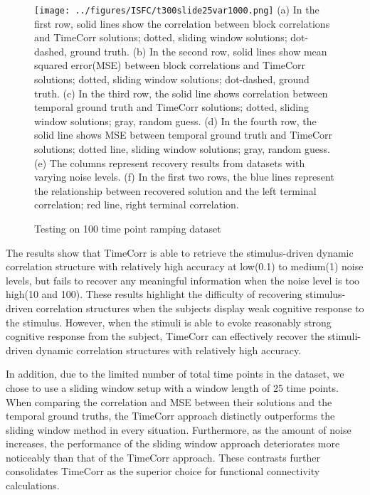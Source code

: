 \documentclass[11pt]{article}
\begin{document}
\begin{figure}[!htb]
\caption{Testing on 100 time point ramping dataset}
\texttt{[image: ../figures/ISFC/t300slide25var1000.png]}
\label{fig:t300slide25var1000}
(a) In the first row, solid lines show the correlation between block correlations and TimeCorr solutions; dotted, sliding window solutions; dot-dashed, ground truth. (b) In the second row, solid lines show mean squared error(MSE) between block correlations and TimeCorr solutions; dotted, sliding window solutions; dot-dashed, ground truth. (c) In the third row, the solid line shows correlation between temporal ground truth and TimeCorr solutions; dotted, sliding window solutions; gray, random guess. (d) In the fourth row, the solid line shows MSE between temporal ground truth and TimeCorr solutions; dotted line, sliding window solutions; gray, random guess. (e) The columns represent recovery results from datasets with varying noise levels. (f) In the first two rows, the blue lines represent the relationship between recovered solution and the left terminal correlation; red line, right terminal correlation.
\end{figure}

The results show that TimeCorr is able to retrieve the stimulus-driven dynamic correlation structure with relatively high accuracy at low(0.1) to medium(1) noise levels, but fails to recover any meaningful information when the noise level is too high(10 and 100). These results highlight the difficulty of recovering stimulus-driven correlation structures when the subjects display weak cognitive response to the stimulus. However, when the stimuli is able to evoke reasonably strong cognitive response from the subject, TimeCorr can effectively recover the stimuli-driven dynamic correlation structures with relatively high accuracy.

In addition, due to the limited number of total time points in the dataset, we chose to use a sliding window setup with a window length of 25 time points. When comparing the correlation and MSE between their solutions and the temporal ground truths, the TimeCorr approach distinctly outperforms the sliding window method in every situation. Furthermore, as the amount of noise increases, the performance of the sliding window approach deteriorates more noticeably than that of the TimeCorr approach. These contrasts further consolidates TimeCorr as the superior choice for functional connectivity calculations.
\end{document}
